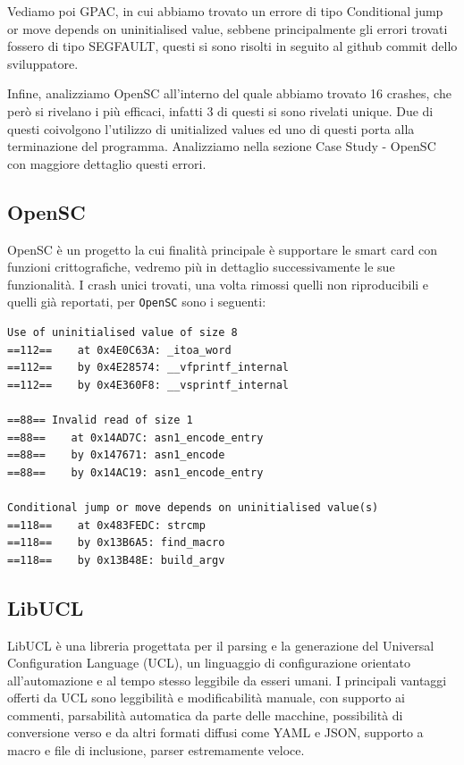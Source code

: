 Vediamo poi GPAC, in cui abbiamo trovato un errore di tipo Conditional jump or move depends on uninitialised value, sebbene principalmente gli errori trovati fossero di tipo SEGFAULT, questi si sono risolti in seguito al github commit dello sviluppatore. 

Infine, analizziamo OpenSC all'interno del quale abbiamo trovato 16 crashes, che però si rivelano i più efficaci, infatti 3 di questi si sono rivelati unique. Due di questi coivolgono l'utilizzo di unitialized values ed uno di questi porta alla terminazione del programma. Analizziamo nella sezione Case Study - OpenSC con maggiore dettaglio questi errori.   

\subsection{OpenSC}

OpenSC è un progetto la cui finalità principale è supportare le smart card con funzioni crittografiche, vedremo più in dettaglio successivamente le sue funzionalità. 
I crash unici trovati, una volta rimossi quelli non riproducibili e quelli già reportati, per \texttt{OpenSC} sono i seguenti:

\begin{verbatim}
Use of uninitialised value of size 8
==112==    at 0x4E0C63A: _itoa_word 
==112==    by 0x4E28574: __vfprintf_internal 
==112==    by 0x4E360F8: __vsprintf_internal 

==88== Invalid read of size 1
==88==    at 0x14AD7C: asn1_encode_entry 
==88==    by 0x147671: asn1_encode 
==88==    by 0x14AC19: asn1_encode_entry 

Conditional jump or move depends on uninitialised value(s)
==118==    at 0x483FEDC: strcmp 
==118==    by 0x13B6A5: find_macro 
==118==    by 0x13B48E: build_argv 
\end{verbatim}

\subsection{LibUCL}

LibUCL è una libreria progettata per il parsing e la generazione del Universal Configuration Language (UCL), un linguaggio di configurazione orientato all’automazione e al tempo stesso leggibile da esseri umani.
I principali vantaggi offerti da UCL sono leggibilità e modificabilità manuale, con supporto ai commenti, parsabilità automatica da parte delle macchine, possibilità di conversione verso e da altri formati diffusi come YAML e JSON, supporto a macro e file di inclusione, parser estremamente veloce.

